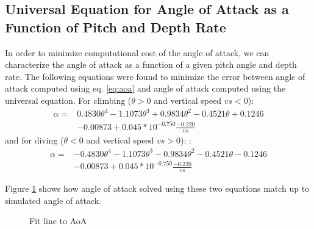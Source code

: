 \documentclass[10pt]{article}
\begin{document}
\subsection{Universal Equation for Angle of Attack as a Function of Pitch and Depth Rate}
In order to minimize computational cost of the angle of attack, we can characterize the angle of attack as a function of a given pitch angle and depth rate.  The following equations were found to minimize the error between angle of attack computed using eq. \ref{eq:aoa} and angle of attack computed using the universal equation.  
For climbing ($\theta > 0$ and vertical speed $vs < 0$):   
\begin{align}
    \alpha = &0.4830\theta^4-1.1073\theta^3+0.9834\theta^2-0.4521\theta+0.1246\\ &-0.00873 +  0.045* 10^{-0.750} \frac{-0.220}{vs}
\end{align}
and for diving ($\theta < 0$ and vertical speed $vs > 0$):  :   
\begin{align}
   \alpha =& -0.4830\theta^4-1.1073\theta^3-0.9834\theta^2-0.4521\theta-0.1246\\ &-0.00873 +  0.045* 10^{-0.750}  \frac{-0.220}{vs}
\end{align}

Figure \ref{fig:fit} shows how angle of attack solved using these two equations match up to simulated angle of attack.
      \begin{figure}[htb]
        \caption{\label{fig:fit}Fit line to AoA }
      \end{figure}
\end{document}
